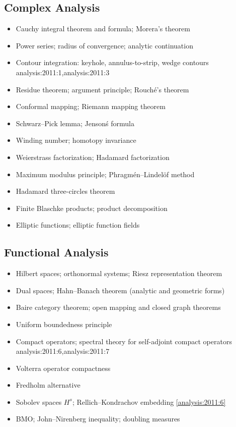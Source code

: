 \subsection{Complex Analysis}

\begin{itemize}
  \item Cauchy integral theorem and formula; Morera's theorem
  \item Power series; radius of convergence; analytic continuation
  \item Contour integration: keyhole, annulus-to-strip, wedge contours \hfill analysis:2011:1,analysis:2011:3
  \item Residue theorem; argument principle; Rouch\'e's theorem
  \item Conformal mapping; Riemann mapping theorem
  \item Schwarz--Pick lemma; Jenson\'s formula
  \item Winding number; homotopy invariance
  \item Weierstrass factorization; Hadamard factorization
  \item Maximum modulus principle; Phragm\'en--Lindel\"of method
  \item Hadamard three-circles theorem
  \item Finite Blaschke products; product decomposition
  \item Elliptic functions; elliptic function fields
\end{itemize}

\subsection{Functional Analysis}

\begin{itemize}
  \item Hilbert spaces; orthonormal systems; Riesz representation theorem
  \item Dual spaces; Hahn--Banach theorem (analytic and geometric forms)
  \item Baire category theorem; open mapping and closed graph theorems
  \item Uniform boundedness principle
  \item Compact operators; spectral theory for self-adjoint compact operators \hfill analysis:2011:6,analysis:2011:7
  \item Volterra operator compactness
  \item Fredholm alternative
  \item Sobolev spaces $H^s$; Rellich--Kondrachov embedding \hfill \cref{analysis:2011:6}
  \item BMO; John--Nirenberg inequality; doubling measures
\end{itemize}

